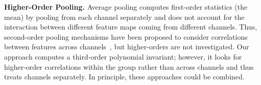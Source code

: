 \textbf{Higher-Order Pooling.} Average pooling computes first-order statistics (the mean) by pooling from each channel separately and does not account for the interaction between different feature maps coming from different channels. Thus, second-order pooling mechanisms have been proposed to consider correlations between features across channels~\cite{lin2015bilinear,gao2019global}, but higher-orders are not investigated. Our approach computes a third-order polynomial invariant; however, it looks for higher-order correlations within the group rather than across channels and thus treats channels separately. In principle, these approaches could be combined.

